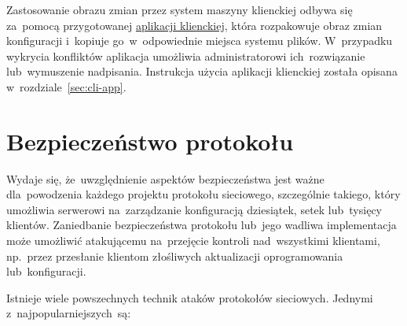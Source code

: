 \documentclass[thesis]{subfiles}
\begin{document}
Zastosowanie obrazu zmian przez system maszyny klienckiej odbywa się za~pomocą przygotowanej \hyperref[sec:cli-app]{aplikacji klienckiej}, która rozpakowuje obraz zmian konfiguracji i~kopiuje go~w~odpowiednie miejsca systemu plików. W~przypadku wykrycia konfliktów aplikacja umożliwia administratorowi ich~rozwiązanie lub~wymuszenie nadpisania. Instrukcja użycia aplikacji klienckiej została opisana w~rozdziale~\ref{sec:cli-app}.


\section{Bezpieczeństwo protokołu}
\label{sec:security}

Wydaje się, że~uwzględnienie aspektów bezpieczeństwa jest ważne dla~powodzenia każdego projektu protokołu sieciowego, szczególnie takiego, który umożliwia serwerowi na~zarządzanie konfiguracją dziesiątek, setek lub~tysięcy klientów. Zaniedbanie bezpieczeństwa protokołu lub~jego wadliwa implementacja może umożliwić atakującemu na~przejęcie kontroli nad~wszystkimi klientami, np.~przez przesłanie klientom złośliwych aktualizacji oprogramowania lub~konfiguracji.

Istnieje wiele powszechnych technik ataków protokołów sieciowych. Jednymi z~najpopularniejszych~są:\mynobreakpar

\end{document}
